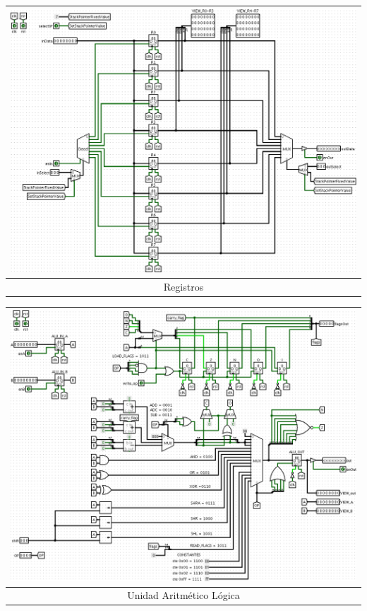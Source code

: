 \documentclass[a4paper,11pt]{article}
\begin{document}

\begin{center}
\begin{tabular}[t]{c}
\includegraphics[scale=0.3]{img/1_registers.png} \\
\hline
Registros\\ \hline
\end{tabular}
\end{center}


\begin{center}
 \begin{tabular}[t]{c}
\includegraphics[scale=0.3]{img/3_ALU.png} \\
\hline
Unidad Aritmético Lógica\\ \hline
\end{tabular}
\end{center}
\end{document}
